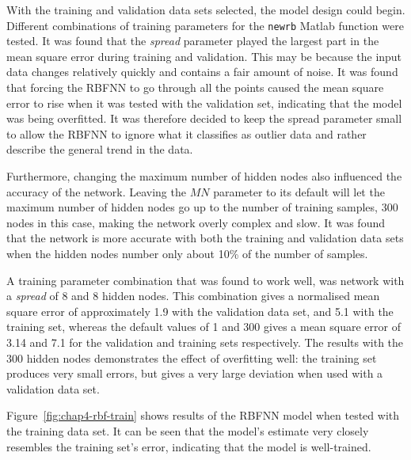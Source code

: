 With the training and validation data sets selected, the model design could begin. Different combinations of training parameters for the \verb|newrb| Matlab function were tested. It was found that the \emph{spread} parameter played the largest part in the mean square error during training and validation. This may be because the input data changes relatively quickly and contains a fair amount of noise. It was found that forcing the RBFNN to go through all the points caused the mean square error to rise when it was tested with the validation set, indicating that the model was being overfitted. It was therefore decided to keep the spread parameter small to allow the RBFNN to ignore what it classifies as outlier data and rather describe the general trend in the data. 

Furthermore, changing the maximum number of hidden nodes also influenced the accuracy of the network. Leaving the $MN$ parameter to its default will let the maximum number of hidden nodes go up to the number of training samples, 300 nodes in this case, making the network overly complex and slow. It was found that the network is more accurate with both the training and validation data sets when the hidden nodes number only about 10\% of the number of samples. 

A training parameter combination that was found to work well, was network with a \emph{spread} of 8 and 8 hidden nodes. This combination gives a normalised mean square error of approximately 1.9 with the validation data set, and 5.1 with the training set, whereas the default values of 1 and 300 gives a mean square error of 3.14 and 7.1 for the validation and training sets respectively. The results with the 300 hidden nodes demonstrates the effect of overfitting well: the training set produces very small errors, but gives a very large deviation when used with a validation data set.    

Figure~\ref{fig:chap4-rbf-train} shows results of the RBFNN model when tested with the training data set. It can be seen that the model's estimate very closely resembles the training set's error, indicating that the model is well-trained. 


